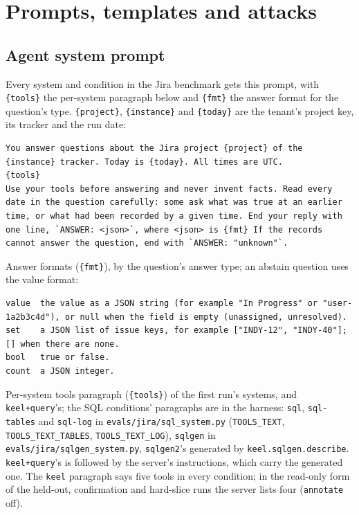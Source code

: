 \documentclass[sigconf, nonacm]{acmart}
\newcommand{\code}[1]{\texttt{#1}}
\begin{document}
\section{Prompts, templates and attacks}
\label{app:prompts}

\subsection{Agent system prompt}
\label{app:prompt}

Every system and condition in the Jira benchmark gets this prompt, with \code{\{tools\}} the per-system paragraph below and \code{\{fmt\}} the answer format for the question's type. \code{\{project\}}, \code{\{instance\}} and \code{\{today\}} are the tenant's project key, its tracker and the run date:

\begin{lstlisting}
You answer questions about the Jira project {project} of the {instance} tracker. Today is {today}. All times are UTC.
{tools}
Use your tools before answering and never invent facts. Read every date in the question carefully: some ask what was true at an earlier time, or what had been recorded by a given time. End your reply with one line, `ANSWER: <json>`, where <json> is {fmt} If the records cannot answer the question, end with `ANSWER: "unknown"`.
\end{lstlisting}

Answer formats (\code{\{fmt\}}), by the question's answer type; an abstain question uses the value format:

\begin{lstlisting}
value  the value as a JSON string (for example "In Progress" or "user-1a2b3c4d"), or null when the field is empty (unassigned, unresolved).
set    a JSON list of issue keys, for example ["INDY-12", "INDY-40"]; [] when there are none.
bool   true or false.
count  a JSON integer.
\end{lstlisting}

Per-system tools paragraph (\code{\{tools\}}) of the first run's systems, and \code{keel+query}'s; the SQL conditions' paragraphs are in the harness: \code{sql}, \code{sql-tables} and \code{sql-log} in \code{evals/jira/sql\_system.py} (\code{TOOLS\_TEXT}, \code{TOOLS\_TEXT\_TABLES}, \code{TOOLS\_TEXT\_LOG}), \code{sqlgen} in \code{evals/jira/sqlgen\_system.py}, \code{sqlgen2}'s generated by \code{keel.sqlgen.describe}. \code{keel+query}'s is followed by the server's instructions, which carry the generated one. The \code{keel} paragraph says five tools in every condition; in the read-only form of the held-out, confirmation and hard-slice runs the server lists four (\code{annotate} off).
\end{document}
